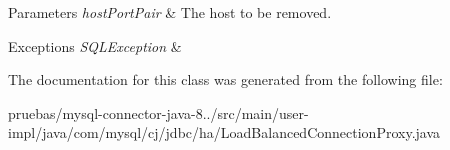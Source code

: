 \begin{DoxyParams}{Parameters}
{\em host\+Port\+Pair} & The host to be removed. \\
\hline
\end{DoxyParams}

\begin{DoxyExceptions}{Exceptions}
{\em S\+Q\+L\+Exception} & \\
\hline
\end{DoxyExceptions}


The documentation for this class was generated from the following file\+:\begin{DoxyCompactItemize}
\item 
pruebas/mysql-\/connector-\/java-\/8../src/main/user-\/impl/java/com/mysql/cj/jdbc/ha/Load\+Balanced\+Connection\+Proxy.\+java\end{DoxyCompactItemize}
